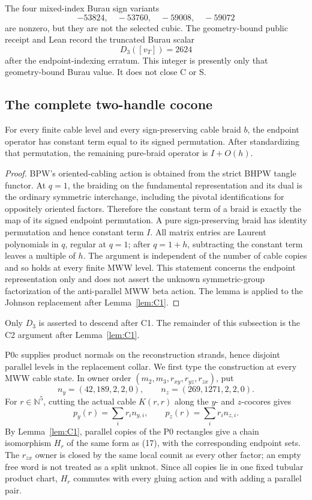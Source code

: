 The four mixed-index Burau sign variants
\[
-53824,\quad -53760,\quad -59008,\quad -59072
\]
are nonzero, but they are not the selected cubic.  The geometry-bound public receipt and
Lean record the truncated Burau scalar
\begin{equation}\label{eq:selectedD3}
D_3([v_T])=2624
\end{equation}
after the endpoint-indexing erratum.  This integer is presently only that
geometry-bound Burau value.  It does not close C or S.

\subsection{The complete two-handle cocone}

\begin{lemma}\label{lem:C2}
For every finite cable level and every sign-preserving cable braid \(b\),
the endpoint operator has constant term equal to its signed permutation.
After standardizing that permutation, the remaining pure-braid operator is
\(I+O(h)\).
\end{lemma}

\begin{proof}
BPW's oriented-cabling action is obtained from the strict BHPW tangle
functor.  At \(q=1\), the braiding on the fundamental representation and its
dual is the ordinary symmetric interchange, including the pivotal
identifications for oppositely oriented factors.  Therefore the constant
term of a braid is exactly the map of its signed endpoint permutation.  A
pure sign-preserving braid has identity permutation and hence constant term
\(I\).  All matrix entries are Laurent polynomials in \(q\), regular at
\(q=1\); after \(q=1+h\), subtracting the constant term leaves a multiple of
\(h\).  The argument is independent of the number of cable copies and so
holds at every finite MWW level.  This statement concerns the endpoint
representation only and does not assert the unknown symmetric-group
factorization of the anti-parallel MWW beta action.
The lemma is applied to the Johnson replacement after Lemma~\ref{lem:C1}.
\end{proof}

Only $D_3$ is asserted to descend after C1.  The remainder of this
subsection is the C2 argument after Lemma~\ref{lem:C1}.

P0c supplies product normals on the reconstruction strands, hence disjoint
parallel levels in the replacement collar.  We first type the construction at every MWW
cable state.  In owner order $(m_2,m_3,r_{xy},r_{yz},r_{zx})$, put
\[
n_y=(42,189,2,2,0),\qquad n_z=(269,1271,2,2,0).
\]
For $r\in\mathbb N^5$, cutting the actual cable $K(r,r)$ along the $y$- and
$z$-cocores gives
\[
p_y(r)=\sum_i r_i n_{y,i},\qquad
p_z(r)=\sum_i r_i n_{z,i}.
\tag{24}
\]
By Lemma~\ref{lem:C1}, parallel copies of the P0 rectangles give a chain isomorphism $H_r$ of the
same form as (17), with the corresponding endpoint sets.  The $r_{zx}$
owner is closed by the same local counit as every other factor; an empty
free word is not treated as a split unknot.  Since all
copies lie in one fixed tubular product chart, $H_r$ commutes with every
gluing action and with adding a parallel pair.


